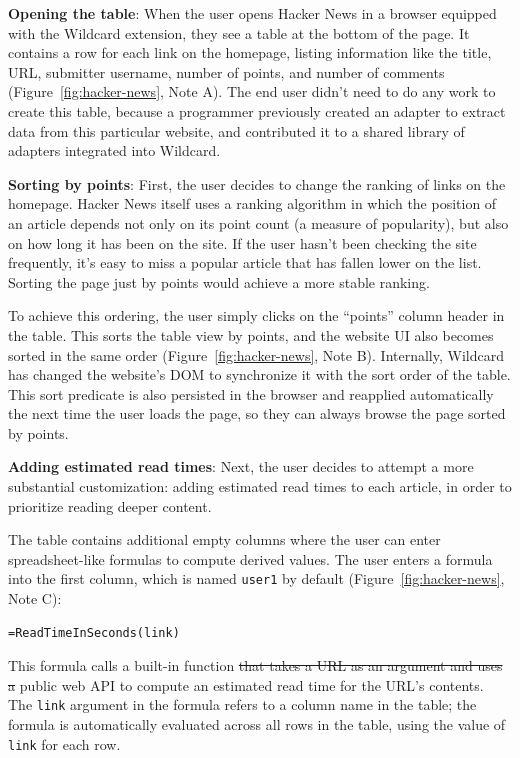 \documentclass[sigplan,screen,10pt,anonymous,review]{acmart}
\providecommand{\DIFadd}[1]{{\protect\color{blue}\uwave{#1}}} %
\providecommand{\DIFdel}[1]{{\protect\color{red}\sout{#1}}}                      %
\providecommand{\DIFaddbegin}{} %
\providecommand{\DIFaddend}{} %
\providecommand{\DIFdelbegin}{} %
\providecommand{\DIFdelend}{} %
\begin{document}
\textbf{Opening the table}: When the user opens Hacker News in a browser
equipped with the Wildcard extension, they see a table at the bottom of
the page. It contains a row for each link on the homepage, listing
information like the title, URL, submitter username, number of points,
and number of comments (Figure~\ref{fig:hacker-news}, Note A). The end
user didn't need to do any work to create this table, because a
programmer previously created an adapter to extract data from this
particular website, and contributed it to a shared library of adapters
integrated into Wildcard.

\textbf{Sorting by points}: First, the user decides to change the
ranking of links on the homepage. Hacker News itself uses a ranking
algorithm in which the position of an article depends not only on its
point count (a measure of popularity), but also on how long it has been
on the site. If the user hasn't been checking the site frequently, it's
easy to miss a popular article that has fallen lower on the list.
Sorting the page just by points would achieve a more stable ranking.

To achieve this ordering, the user simply clicks on the ``points''
column header in the table. This sorts the table view by points, and the
website UI also becomes sorted in the same order
(Figure~\ref{fig:hacker-news}, Note B). Internally, Wildcard has changed
the website's DOM to synchronize it with the sort order of the table.
This sort predicate is also persisted in the browser and reapplied
automatically the next time the user loads the page, so they can always
browse the page sorted by points.

\textbf{Adding estimated read times}: Next, the user decides to attempt
a more substantial customization: adding estimated read times to each
article, in order to prioritize reading deeper content.

The table contains additional empty columns where the user can enter
spreadsheet-like formulas to compute derived values. The user enters a
formula into the first column, which is named \texttt{user1} by default
(Figure~\ref{fig:hacker-news}, Note C):

\begin{verbatim}
=ReadTimeInSeconds(link)
\end{verbatim}

This formula calls a built-in function \DIFdelbegin \DIFdel{that takes a URL as an argument
and uses a }\DIFdelend \DIFaddbegin \texttt{\DIFadd{ReadTimeInSeconds}} \DIFadd{that
uses a third-party }\DIFaddend public web API to compute an estimated read time for
the URL's contents. The \texttt{link} argument in the formula refers to
a column name in the table; the formula is automatically evaluated
across all rows in the table, using the value of \texttt{link} for each
row.
\end{document}
